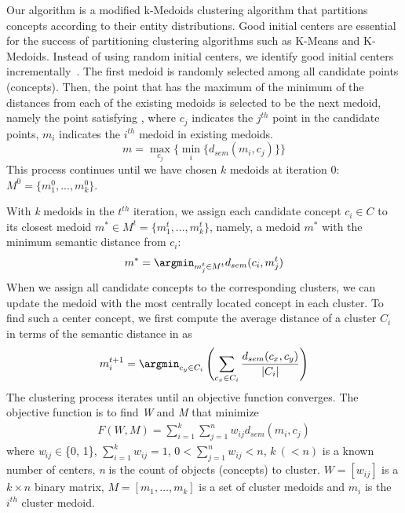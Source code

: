 Our algorithm is a modified k-Medoids clustering algorithm that
partitions concepts according to their entity distributions.  Good
initial centers are essential for the success of partitioning
clustering algorithms such as K-Means and K-Medoids. Instead of using
random initial centers, we identify good initial centers
incrementally~\cite{Moore:1991}.  The first medoid is randomly
selected among all candidate points (concepts). Then, the point that has the maximum of the minimum of the distances from each of the existing medoids is selected to be the next medoid, namely the point satisfying , where $c_j$ indicates the $j^{th}$ point in the candidate points, $m_i$ indicates the $i^{th}$ medoid in existing medoids.
\begin{equation}
m = \max_{c_j}\{\min_{i}\{d_{sem}(m_i,c_j)\}\}
\label{eq:initMedoid}
\end{equation}
This process continues until we
have chosen $k$ medoids at iteration 0: $M^{0} = \{m_{1}^{0}, ...,
m_{k}^{0}\}$.

With \emph{k} medoids in the $t^{th}$ iteration, we assign each
candidate concept $c_{i} \in C$ to its closest medoid $m^{*}\in M^{t}
= \{m_{1}^{t}, ..., m_{k}^{t}\}$, namely, a medoid $m^{*}$ with the
minimum semantic distance from $c_{i}$:
\begin{equation}
\label{eq:newCentroid}
m^* = \argmin_{m_{j}^{t}\in M^{t}}d_{sem}(c_{i}, m_{j}^{t})
\end{equation}
When we assign all candidate concepts to the corresponding clusters,
we can update the medoid with the most centrally located concept in
each cluster.  To find such a center concept, we first compute the
average distance of a cluster $C_{i}$ in terms of the semantic
distance in  as
\begin{equation}
\label{eq:update}
m_i^{t+1} = \argmin_{c_{y}\in C_{i}}\left(\sum_{c_x\in C_{i}}\frac{d_{sem}(c_{x},c_y)}{|C_{i}|}\right)
\end{equation}
The clustering process iterates until an objective function converges.
The objective function is to find \emph{W} and \emph{M} that minimize
\begin{equation}
\label{eq:objectiveFun}
\begin{aligned}
F(W,M)=\sum^{k}_{i=1}\sum^{n}_{j=1}w_{ij}d_{sem}(m_{i},c_{j})
\end{aligned}
\end{equation}
where \textit{w}$_{ij}\in$\{0, 1\},
$\sum^{k}_{i=1}w_{ij}=1$, 0$<\sum^{n}_{j=1}w_{ij}<n$,
$k~ (<n)$ is a known number of centers, \emph{n} is the count of objects (concepts) to cluster.
$W = [w_{ij}]$ is a
$k \times n$ binary matrix, $M=[m_{1}, \ldots, m_{k}]$ is a set of cluster medoids
and $m_i$ is the $i^{th}$ cluster medoid.

